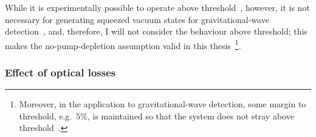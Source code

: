 While it is experimentally possible to operate above threshold~\cite{}, however, it is not necessary for generating squeezed vacuum states for gravitational-wave detection~\cite{}, and, therefore, I will not consider the behaviour above threshold; this makes the no-pump-depletion assumption valid in this thesis~\footnote{Moreover, in the application to gravitational-wave detection, some margin to threshold, e.g.\ $5\%$, is maintained so that the system does not stray above threshold~\cite{}.}.

\subsubsection{Effect of optical losses}

